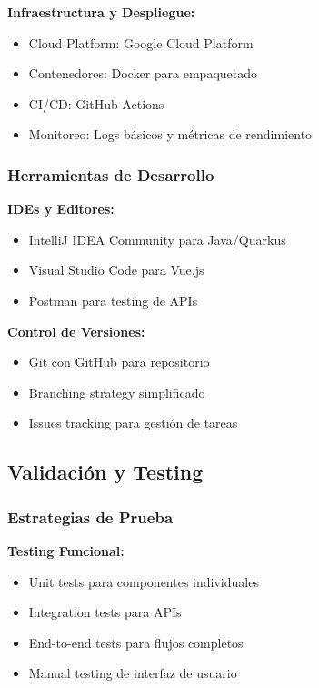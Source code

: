 \textbf{Infraestructura y Despliegue:}
\begin{itemize}
    \item Cloud Platform: Google Cloud Platform
    \item Contenedores: Docker para empaquetado
    \item CI/CD: GitHub Actions
    \item Monitoreo: Logs básicos y métricas de rendimiento
\end{itemize}

\subsubsection{Herramientas de Desarrollo}

\textbf{IDEs y Editores:}
\begin{itemize}
    \item IntelliJ IDEA Community para Java/Quarkus
    \item Visual Studio Code para Vue.js
    \item Postman para testing de APIs
\end{itemize}

\textbf{Control de Versiones:}
\begin{itemize}
    \item Git con GitHub para repositorio
    \item Branching strategy simplificado
    \item Issues tracking para gestión de tareas
\end{itemize}

\subsection{Validación y Testing}

\subsubsection{Estrategias de Prueba}

\textbf{Testing Funcional:}
\begin{itemize}
    \item Unit tests para componentes individuales
    \item Integration tests para APIs
    \item End-to-end tests para flujos completos
    \item Manual testing de interfaz de usuario
\end{itemize}

